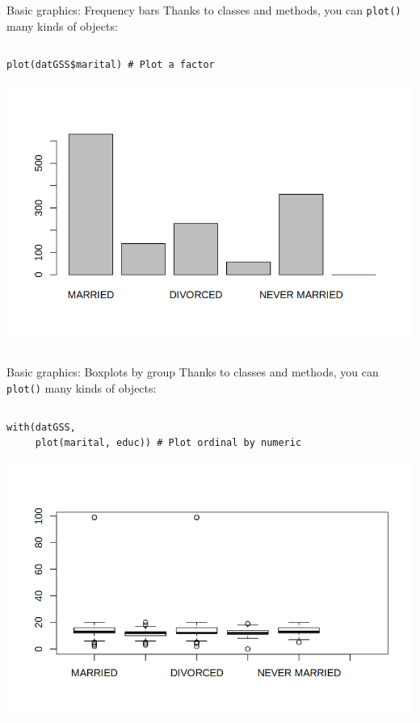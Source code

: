 \documentclass[table,smaller]{beamer}
\begin{document}
\begin{frame}[fragile,label=sec-7-7]{Basic graphics: Frequency bars}
 Thanks to classes and methods, you can \verb~plot()~ many  kinds of objects:

\begin{columns}  \begin{block}{}
\begin{verbatim}
plot(datGSS$marital) # Plot a factor
\end{verbatim}
\includegraphics[width=.9\textwidth]{images/examplePlot1.png}



\end{block} \end{columns}
\end{frame}

\begin{frame}[fragile,label=sec-7-8]{Basic graphics: Boxplots by group}
 Thanks to classes and methods, you can \verb~plot()~ many kinds of objects:
\begin{columns}  \begin{block}{}
\begin{verbatim}
with(datGSS,
     plot(marital, educ)) # Plot ordinal by numeric
\end{verbatim}
\includegraphics[width=.9\textwidth]{images/examplePlot2.png}
\end{block} \end{columns}
\end{frame}
\end{document}

